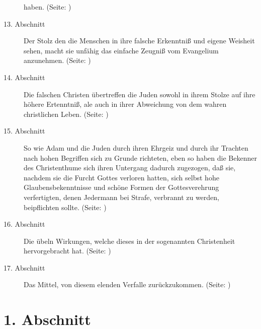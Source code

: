 \begin{description}
haben. (Seite: \pageref{kap7_ab12})
\item[13. Abschnitt] Der Stolz den die Menschen in ihre falsche Erkenntniß und
eigene Weisheit sehen, macht sie unfähig das einfache Zeugniß vom Evangelium
anzunehmen. (Seite: \pageref{kap7_ab13})
\item[14. Abschnitt] Die falschen Christen übertreffen die Juden sowohl in ihrem
Stolze auf ihre höhere Ertenntniß, ale auch in ihrer Abweichung von dem wahren
christlichen Leben. (Seite: \pageref{kap7_ab14})
\item[15. Abschnitt] So wie Adam und die Juden durch ihren Ehrgeiz und durch ihr
Trachten nach hohen Begriffen sich zu Grunde richteten, eben so haben die
Bekenner des Christenthume sich ihren Untergang dadurch zugezogen, daß sie,
nachdem sie die Furcht Gottes verloren hatten, sich selbst hohe
Glaubensbekenntnisse und schöne Formen der Gottesverehrung verfertigten, denen
Jedermann bei Strafe, verbrannt zu werden, beipflichten sollte. (Seite: \pageref{kap7_ab15})
\item[16. Abschnitt] Die übeln Wirkungen, welche dieses in der sogenannten
Christenheit hervorgebracht hat. (Seite: \pageref{kap7_ab16})
\item[17. Abschnitt] Das Mittel, von diesem elenden Verfalle zurückzukommen. (Seite: \pageref{kap7_ab17})

\end{description}
\normalsize


\section{1. Abschnitt} \label{kap7_ab1}

